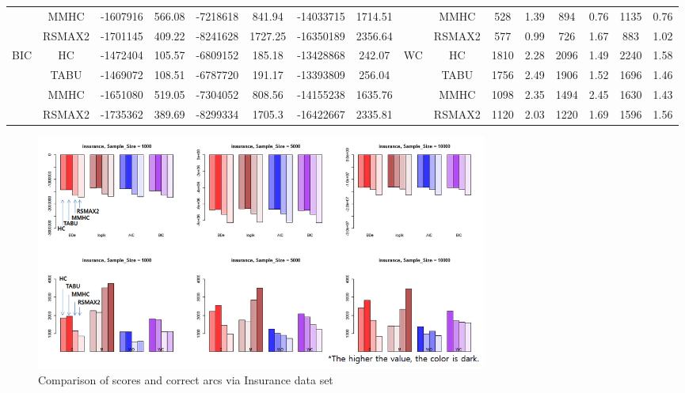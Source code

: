 \begin{table}[p]
{\begin{tabular}{cc||cc|cc|cc||cc|cc|cc|cc}
& MMHC &	-1607916 & 	566.08 & 	-7218618 & 	841.94 & 	-14033715 & 	1714.51 & 	& MMHC &	528 & 	1.39 & 	894 & 	0.76 & 	1135 & 	0.76\tabularnewline													
& RSMAX2 &	-1701145 & 	409.22 & 	-8241628 & 	1727.25 & 	-16350189 & 	2356.64 & 	& RSMAX2 &	577 & 	0.99 & 	726 & 	1.67 & 	883 & 	1.02\tabularnewline													
\hline																										
\multirow{4}{*}{BIC} & HC &	-1472404 & 	105.57 & 	-6809152 & 	185.18 & 	-13428868 & 	242.07 & 	\multirow{4}{*}{WC} & HC &	1810 & 	2.28 & 	2096 & 	1.49 & 	2240 & 	1.58\tabularnewline													
& TABU &	-1469072 & 	108.51 & 	-6787720 & 	191.17 & 	-13393809 & 	256.04 & 	& TABU &	1756 & 	2.49 & 	1906 & 	1.52 & 	1696 & 	1.46\tabularnewline													
& MMHC &	-1651080 & 	519.05 & 	-7304052 & 	808.56 & 	-14155238 & 	1635.76 & 	& MMHC &	1098 & 	2.35 & 	1494 & 	2.45 & 	1630 & 	1.43\tabularnewline													
& RSMAX2 &	-1735362 & 	389.69 & 	-8299334 & 	1705.3 & 	-16422667 & 	2335.81 & 	& RSMAX2 &	1120 & 	2.03 & 	1220 & 	1.69 & 	1596 & 	1.56\tabularnewline													
\hline																										
\end{tabular}																										
}																										
\end{table}

	\begin{figure}[p]
	\centering
		\includegraphics[height=220pt]{images/Real_2_Insurance}
		\caption{Comparison of scores and correct arcs via Insurance data set}
	\end{figure}	